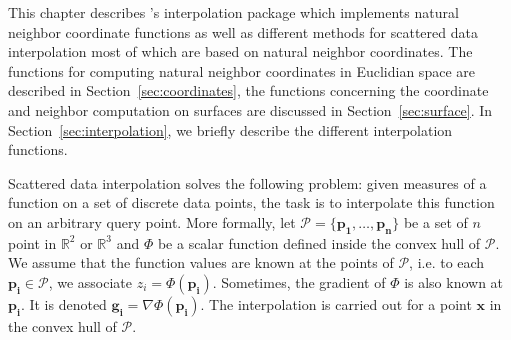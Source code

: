 This chapter describes \cgal's interpolation package which implements
natural neighbor coordinate functions as well as different
methods for scattered data interpolation most of which are based on
natural neighbor coordinates. The functions for computing natural neighbor 
coordinates in Euclidian space are described in 
Section~\ref{sec:coordinates}, 
the functions concerning the coordinate and neighbor 
computation on surfaces are discussed in Section~\ref{sec:surface}. 
In Section~\ref{sec:interpolation}, we briefly describe the different interpolation functions.   

Scattered data interpolation solves the following problem: given
measures of a function on a set of discrete data points, the task is
to interpolate this function on an arbitrary query point.
More formally, let $\mathcal{P}=\{\mathbf{p_1},\ldots ,\mathbf{p_n}\}$ be a set of
$n$ point in $\mathbb{R}^2$ or $\mathbb{R}^3$ and $\Phi$ be a scalar
function defined inside the convex hull of $\mathcal{P}$. We assume that
the function values are known at the points of $\mathcal{P}$, i.e. to
each $\mathbf{p_i} \in \mathcal{P}$, we associate $z_i =
\Phi(\mathbf{p_i})$. Sometimes, the gradient of $\Phi$ is also known
at $\mathbf{p_i}$. It is denoted $\mathbf{g_i}= \nabla
\Phi(\mathbf{p_i})$. The interpolation is carried out for a point
$\mathbf{x}$ in the convex hull of $\mathcal{P}$.
